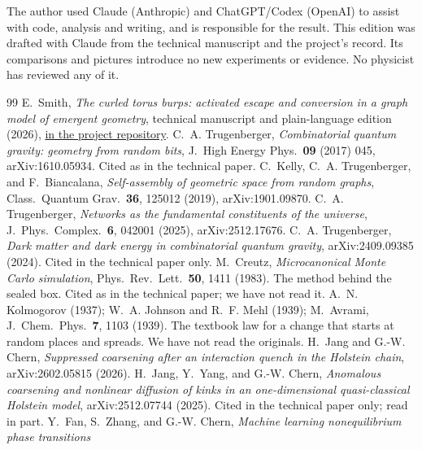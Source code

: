\documentclass[11pt,letterpaper]{article}
\newcommand{\sub}[1]{\par\medskip{\color{ink}\large\bfseries #1}\par}
\begin{document}
\sub{Disclosure}
The author used Claude (Anthropic) and ChatGPT/Codex (OpenAI) to assist with code, analysis and
writing, and is responsible for the result. This edition was drafted with Claude from the technical
manuscript and the project's record. Its comparisons and pictures introduce no new experiments or
evidence. No physicist has reviewed any of it.

\renewcommand{\refname}{Sources}
\begin{thebibliography}{99}\small
 E.~Smith, \emph{The curled torus burps: activated escape and conversion in a graph model
of emergent geometry}, technical manuscript and plain-language edition (2026),
\href{https://github.com/EmilySmithCreate/RecreationalPhysics/tree/main/docs/papers/01_curled_torus}{in the project repository}.
 C.~A. Trugenberger, \emph{Combinatorial quantum gravity: geometry from random bits},
J.\ High Energy Phys.\ \textbf{09} (2017) 045, arXiv:1610.05934. Cited as in the technical paper.
 C.~Kelly, C.~A. Trugenberger, and F.~Biancalana, \emph{Self-assembly of geometric space
from random graphs}, Class.\ Quantum Grav.\ \textbf{36}, 125012 (2019), arXiv:1901.09870.
 C.~A. Trugenberger, \emph{Networks as the fundamental constituents of the universe},
J.\ Phys.\ Complex.\ \textbf{6}, 042001 (2025), arXiv:2512.17676.
 C.~A. Trugenberger, \emph{Dark matter and dark energy in combinatorial quantum gravity},
arXiv:2409.09385 (2024). Cited in the technical paper only.
 M.~Creutz, \emph{Microcanonical Monte Carlo simulation}, Phys.\ Rev.\ Lett.\ \textbf{50},
1411 (1983). The method behind the sealed box. Cited as in the technical paper; we have not read it.
 A.~N. Kolmogorov (1937); W.~A. Johnson and R.~F. Mehl (1939); M.~Avrami, J.\ Chem.\ Phys.\
\textbf{7}, 1103 (1939). The textbook law for a change that starts at random places and spreads. We
have not read the originals.
 H.~Jang and G.-W. Chern, \emph{Suppressed coarsening after an interaction quench in the
Holstein chain}, arXiv:2602.05815 (2026).
 H.~Jang, Y.~Yang, and G.-W. Chern, \emph{Anomalous coarsening and nonlinear diffusion of
kinks in an one-dimensional quasi-classical Holstein model}, arXiv:2512.07744 (2025). Cited in the
technical paper only; read in part.
 Y.~Fan, S.~Zhang, and G.-W. Chern, \emph{Machine learning nonequilibrium phase transitions
}
\end{thebibliography}
\end{document}
